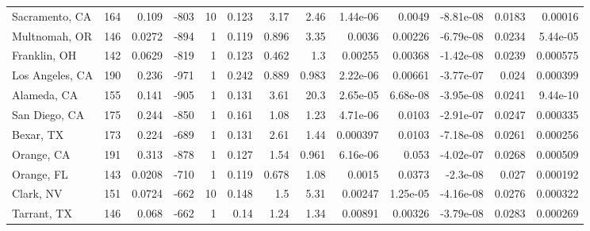 \documentclass[12pt,letterpaper]{article}
\begin{document}
\begin{appendices}
\begin{sidewaystable}
{\begin{tabular}{lrrrrrrrrrrrr}
 Sacramento, CA     & 164   & 0.109   &  -803 &    10 &           0.123 &            3.17  &          2.46  &    1.44e-06  &     0.0049   &        -8.81e-08 &           0.0183  &       0.00016   \\
 Multnomah, OR      & 146   & 0.0272  &  -894 &     1 &           0.119 &            0.896 &          3.35  &    0.0036    &     0.00226  &        -6.79e-08 &           0.0234  &       5.44e-05  \\
 Franklin, OH       & 142   & 0.0629  &  -819 &     1 &           0.123 &            0.462 &          1.3   &    0.00255   &     0.00368  &        -1.42e-08 &           0.0239  &       0.000575  \\
 Los Angeles, CA    & 190   & 0.236   &  -971 &     1 &           0.242 &            0.889 &          0.983 &    2.22e-06  &     0.00661  &        -3.77e-07 &           0.024   &       0.000399  \\
 Alameda, CA        & 155   & 0.141   &  -905 &     1 &           0.131 &            3.61  &         20.3   &    2.65e-05  &     6.68e-08 &        -3.95e-08 &           0.0241  &       9.44e-10  \\
 San Diego, CA      & 175   & 0.244   &  -850 &     1 &           0.161 &            1.08  &          1.23  &    4.71e-06  &     0.0103   &        -2.91e-07 &           0.0247  &       0.000335  \\
 Bexar, TX          & 173   & 0.224   &  -689 &     1 &           0.131 &            2.61  &          1.44  &    0.000397  &     0.0103   &        -7.18e-08 &           0.0261  &       0.000256  \\
 Orange, CA         & 191   & 0.313   &  -878 &     1 &           0.127 &            1.54  &          0.961 &    6.16e-06  &     0.053    &        -4.02e-07 &           0.0268  &       0.000509  \\
 Orange, FL         & 143   & 0.0208  &  -710 &     1 &           0.119 &            0.678 &          1.08  &    0.0015    &     0.0373   &        -2.3e-08  &           0.027   &       0.000192  \\
 Clark, NV          & 151   & 0.0724  &  -662 &    10 &           0.148 &            1.5   &          5.31  &    0.00247   &     1.25e-05 &        -4.16e-08 &           0.0276  &       0.000322  \\
 Tarrant, TX        & 146   & 0.068   &  -662 &     1 &           0.14  &            1.24  &          1.34  &    0.00891   &     0.00326  &        -3.79e-08 &           0.0283  &       0.000269  \\

\end{tabular}}
\end{sidewaystable}
\end{appendices}
\end{document}
